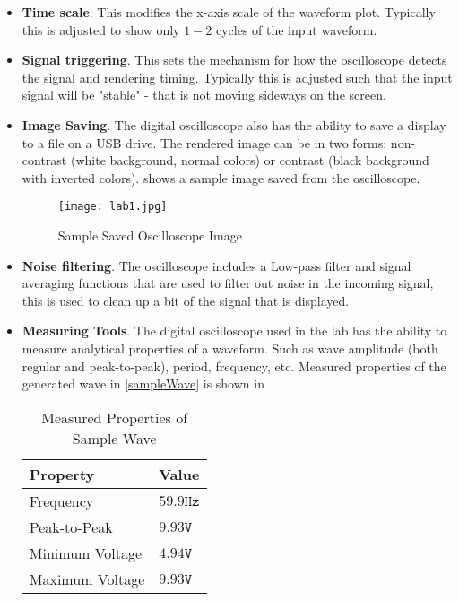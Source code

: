 \documentclass[main.tex]{subfile}
\begin{document}
\begin{itemize}
	\item \textbf{Time scale}. This modifies the x-axis scale of the waveform
		plot. Typically this is adjusted to show only $1-2$ cycles of the input waveform.
	\item \textbf{Signal triggering}. This sets the mechanism for how the
		oscilloscope detects the signal and rendering timing. Typically this is
		adjusted such that the input signal will be "stable" - that is not moving
		sideways on the screen.
	\item \textbf{Image Saving}. The digital oscilloscope also has the ability
		to save a display to a file on a USB drive. The rendered image can be in
		two forms: non-contrast (white background, normal colors)  or contrast
		(black background with inverted colors).  shows a sample
		image saved from the oscilloscope.

		\begin{figure}[!t]
			\centering
			\texttt{[image: lab1.jpg]}
			\caption{Sample Saved Oscilloscope Image}
			\label{fig:sampleImage}
		\end{figure}

	\item \textbf{Noise filtering}. The oscilloscope includes a Low-pass filter
		and signal averaging functions that are used to filter out noise in the
		incoming signal, this is used to clean up a bit of the signal that is
		displayed.
	\item \textbf{Measuring Tools}. The digital oscilloscope used in the lab has
		the ability to measure analytical properties of a waveform. Such as wave
		amplitude (both regular and peak-to-peak), period, frequency, etc. Measured
		properties of the generated wave in \eqref{sampleWave} is shown in

		\begin{table}[H]
			\begin{center}
				\caption{Measured Properties of Sample Wave}
				\label{tab:measuredProp}
				\begin{tabular}{ll}
					\\ \toprule
					Property & Value 
					\\ \midrule
					Frequency & $59.9\texttt{Hz}$
					\\Peak-to-Peak & $9.93\texttt{V}$
					\\Minimum Voltage & $4.94\texttt{V}$
					\\Maximum Voltage & $9.93\texttt{V}$
					\\ \bottomrule
				\end{tabular}
			\end{center}
		\end{table}

\end{itemize}
\end{document}
